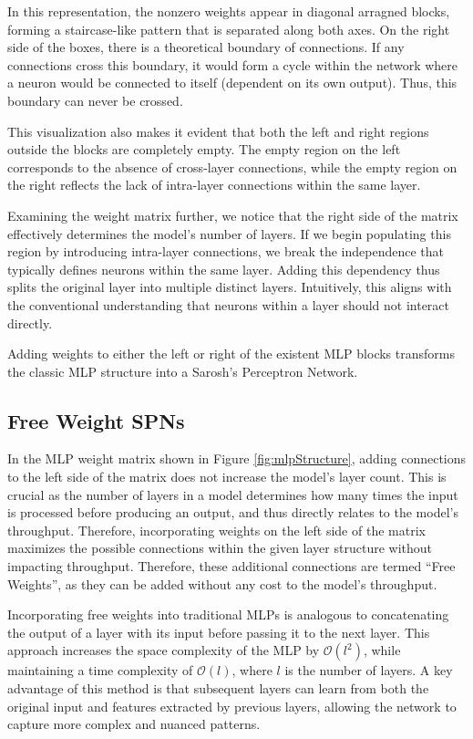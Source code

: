 In this representation, the nonzero weights appear in diagonal arragned blocks, forming a staircase-like pattern that is separated along both axes. On the right side of the boxes, there is a theoretical boundary of connections. If any connections cross this boundary, it would form a cycle within the network where a neuron would be connected to itself (dependent on its own output). Thus, this boundary can never be crossed.

This visualization also makes it evident that both the left and right regions outside the blocks are completely empty. The empty region on the left corresponds to the absence of cross-layer connections, while the empty region on the right reflects the lack of intra-layer connections within the same layer.

Examining the weight matrix further, we notice that the right side of the matrix effectively determines the model’s number of layers. If we begin populating this region by introducing intra-layer connections, we break the independence that typically defines neurons within the same layer. Adding this dependency thus splits the original layer into multiple distinct layers. Intuitively, this aligns with the conventional understanding that neurons within a layer should not interact directly.

Adding weights to either the left or right of the existent MLP blocks transforms the classic MLP structure into a Sarosh’s Perceptron Network.

\subsection{Free Weight SPNs}

In the MLP weight matrix shown in Figure \ref{fig:mlpStructure}, adding connections to the left side of the matrix does not increase the model's layer count. This is crucial as the number of layers in a model determines how many times the input is processed before producing an output, and thus directly relates to the model’s throughput. Therefore, incorporating weights on the left side of the matrix maximizes the possible connections within the given layer structure without impacting throughput. Therefore, these additional connections are termed “Free Weights”, as they can be added without any cost to the model's throughput. 

Incorporating free weights into traditional MLPs is analogous to concatenating the output of a layer with its input before passing it to the next layer. This approach increases the space complexity of the MLP by $\mathcal{O}(l^2)$, while maintaining a time complexity of $\mathcal{O}(l)$, where $l$ is the number of layers. A key advantage of this method is that subsequent layers can learn from both the original input and features extracted by previous layers, allowing the network to capture more complex and nuanced patterns.

